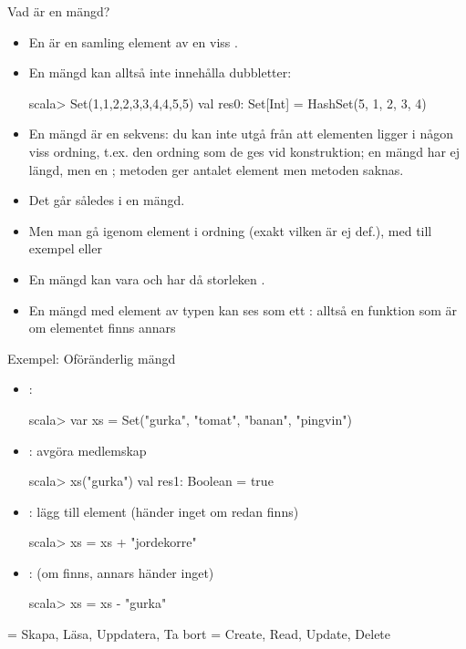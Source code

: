 

\begin{Slide}{Vad är en mängd?}\SlideFontSmall
\begin{itemize}
\item En  är en samling  element av en viss .
\item En mängd kan alltså inte innehålla dubbletter:
\begin{REPLnonum}
scala> Set(1,1,2,2,3,3,4,4,5,5)
val res0: Set[Int] = HashSet(5, 1, 2, 3, 4)
\end{REPLnonum}
\pause
\item En mängd är   en sekvens: du kan inte utgå från att elementen ligger i någon viss ordning, t.ex. den ordning som de ges vid konstruktion; en mängd har ej längd, men en ; metoden  ger antalet element men metoden  saknas.
\item Det går således  i en mängd.
\item Men man  gå igenom element i  ordning (exakt vilken är ej def.), med till exempel  eller 
\item En mängd kan vara  och har då storleken .
\pause
\item En mängd  med element av typen  kan ses som ett : alltså en funktion  som är  om elementet finns annars 
\end{itemize}
\end{Slide}


\begin{Slide}{Exempel: Oföränderlig mängd}
\setlength{\leftmargini}{1em}
\begin{itemize}
\item {}:
\begin{REPLnonum}
scala> var xs = Set("gurka", "tomat", "banan", "pingvin")
\end{REPLnonum}

\item {}: avgöra medlemskap
\begin{REPLnonum}
scala> xs("gurka")
val res1: Boolean = true
\end{REPLnonum}

\item {}: lägg till element (händer inget om redan finns)
\begin{REPLnonum}
scala> xs = xs + "jordekorre"
\end{REPLnonum}

\item {}: (om finns, annars händer inget)
\begin{REPLnonum}
scala> xs = xs - "gurka"
\end{REPLnonum}
\end{itemize}
{\SlideFontTiny{} = Skapa, Läsa, Uppdatera, Ta bort \hfill{} = Create, Read, Update, Delete}
\end{Slide}


